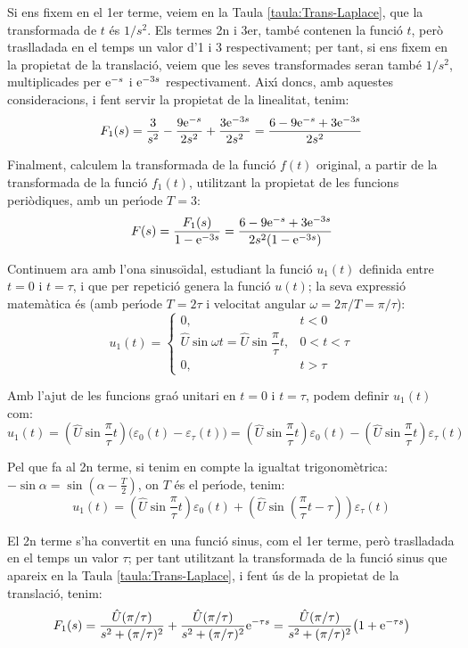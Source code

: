 \begin{exemple}
Si ens fixem en el 1er terme, veiem en la Taula
\vref{taula:Trans-Laplace}, que la  transformada de $t$ \'{e}s $1/s^2$.
Els termes 2n i 3er, tamb\'{e} contenen la funci\'{o} $t$, per\`{o} traslladada
en el temps un valor d'1 i 3 respectivament; per tant, si ens fixem
en la propietat de la translaci\'{o}, veiem que les seves transformades
seran tamb\'{e} $1/s^2$, multiplicades per $\mathrm{e}^{-s}$ i $\mathrm{e}^{-3s}$
respectivament. Aix\'{\i} doncs, amb aquestes consideracions, i fent
servir la propietat de la linealitat, tenim:
\[
    F_1(s) = \frac{3}{s^2} - \frac{9 \mathrm{e}^{-s}}{2 s^2} + \frac{3 \mathrm{e}^{-3s}}{2
    s^2} =\frac{6-9\mathrm{e}^{-s}+3\mathrm{e}^{-3s}}{2s^2}
\]

Finalment, calculem la transformada de la funci\'{o} $f(t)$ original, a
partir de la transformada de la funci\'{o} $f_1(t)$, utilitzant la
propietat de les funcions peri\`{o}diques, amb un per\'{\i}ode $T=3$:
\[
    F(s) = \frac{F_1(s)}{1-\mathrm{e}^{-3s}} = \frac{6-9\mathrm{e}^{-s}+3\mathrm{e}^{-3s}}{2s^2(1-\mathrm{e}^{-3s}) }
\]

Continuem ara  amb l'ona sinuso\"{\i}dal, estudiant la funci\'{o} $u_1(t)$
definida entre $t=0$ i $t=\tau$, i que per repetici\'{o} genera la
funci\'{o} $u(t)$; la seva expressi\'{o} matem\`{a}tica \'{e}s (amb per\'{\i}ode $T=
2\tau$ i velocitat angular $\omega= 2\pi/T  = \pi/\tau$):
\[
    u_1(t) = \begin{cases} 0, & t < 0\\ \hat{U}\sin\omega t =
    \hat{U}\sin\dfrac{\pi}{\tau}t,  & 0<t<\tau \\ 0, & t > \tau \end{cases}
\]


Amb l'ajut de les funcions gra\'{o} unitari en $t=0$ i $t=\tau$, podem
definir $u_1(t)$ com:
\[
    u_1(t)=\left(\hat{U}\sin\frac{\pi}{\tau}t\right)\bigl(\varepsilon_0(t)-\varepsilon_\tau(t)\bigr)
    =\left(\hat{U}\sin\frac{\pi}{\tau}t\right)\varepsilon_0(t) - \left(\hat{U}\sin\frac{\pi}{\tau}t\right)\varepsilon_\tau(t)
\]

Pel que fa al 2n  terme, si tenim en compte la igualtat
trigonom\`{e}trica: $-\sin \alpha = \sin(\alpha-\frac{T}{2})$, on $T$ \'{e}s
el per\'{\i}ode, tenim:
\[
    u_1(t) = \left(\hat{U}\sin\frac{\pi}{\tau}t\right)\varepsilon_0(t) +
    \left(\hat{U}\sin\left(\frac{\pi}{\tau}t-\tau\right)\right)\varepsilon_\tau(t)
\]

El 2n terme s'ha convertit en una funci\'{o} sinus, com el 1er terme,
per\`{o} traslladada en el temps un valor $\tau$; per tant utilitzant la
transformada de la funci\'{o} sinus que apareix en la Taula
\vref{taula:Trans-Laplace}, i fent \'{u}s de la propietat de la
translaci\'{o}, tenim:
\[
    F_1(s) = \frac{\hat{U} (\pi/\tau)}{s^2 + (\pi/\tau)^2} +
    \frac{\hat{U} (\pi/\tau)}{s^2 + (\pi/\tau)^2} \mathrm{e}^{-\tau s} =
    \frac{\hat{U} (\pi/\tau)}{s^2 + (\pi/\tau)^2} \bigl( 1+\mathrm{e}^{-\tau s}
    \big)
\]


\end{exemple}
